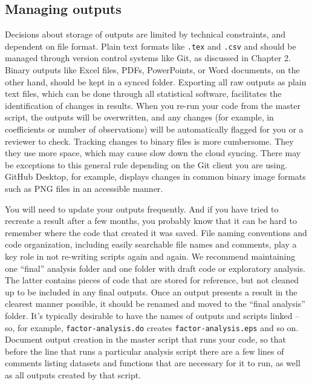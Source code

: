\subsection{Managing outputs}

Decisions about storage of outputs are limited by technical constraints,
and dependent on file format.
Plain text formats like \texttt{.tex} and \texttt{.csv}
and should be managed through version control systems like Git,
as discussed in Chapter 2.
Binary outputs like Excel files, PDFs, PowerPoints, or Word documents,
on the other hand, should be kept in a synced folder.
Exporting all raw outputs as plain text files,
which can be done through all statistical software,
facilitates the identification of changes in results.
When you re-run your code from the master script,
the outputs will be overwritten,
and any changes (for example, in coefficients or number of observations)
will be automatically flagged for you or a reviewer to check.
Tracking changes to binary files is more cumbersome.
They they use more space,
which may cause slow down the cloud syncing.
There may be exceptions to this general rule
depending on the Git client you are using.
GitHub Desktop, for example,
displays changes in common binary image formats such as PNG files
in an accessible manner.

You will need to update your outputs frequently.
And if you have tried to recreate a result after a few months,
you probably know that it can be hard to remember where the code that created it was saved.
File naming conventions and code organization,
including easily searchable file names and comments,
play a key role in not re-writing scripts again and again.
We recommend maintaining one ``final'' analysis folder
and one folder with draft code or exploratory analysis.
The latter contains pieces of code that are stored for reference,
but not cleaned up to be included in any final outputs.
Once an output presents a result in the clearest manner possible,
it should be renamed and moved to the ``final analysis'' folder.
It's typically desirable to have the names of outputs and scripts linked --
so, for example, \texttt{factor-analysis.do} creates \texttt{factor-analysis.eps} and so on.
Document output creation in the master script that runs your code,
so that before the line that runs a particular analysis script
there are a few lines of comments listing
datasets and functions that are necessary for it to run,
as well as all outputs created by that script.


